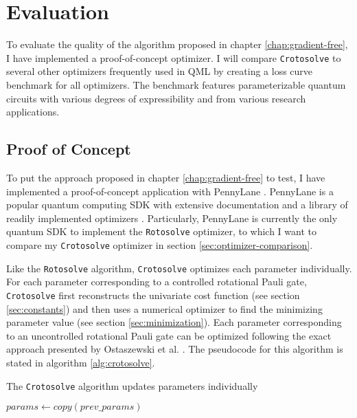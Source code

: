 \chapter{Evaluation}
\label{chap:evaluation}

To evaluate the quality of the algorithm proposed in chapter
\ref{chap:gradient-free}, I have implemented a proof-of-concept optimizer.
I will compare \texttt{Crotosolve} to several other optimizers frequently used
in QML by creating a loss curve benchmark for all optimizers.
The benchmark features parameterizable quantum circuits with various degrees of
expressibility and from various research applications.

\section{Proof of Concept}
\label{sec:proof-of-concept}
To put the approach proposed in chapter \ref{chap:gradient-free} to test,
I have implemented a proof-of-concept application with PennyLane
\cite{bergholm_pennylane_2018}.
PennyLane is a popular quantum computing SDK with extensive documentation and a
library of readily implemented optimizers \cite{unitary_fund_team_results_2022}.
Particularly, PennyLane is currently the only quantum SDK to implement the
\texttt{Rotosolve} optimizer, to which I want to compare my \texttt{Crotosolve}
optimizer in section \ref{sec:optimizer-comparison}.

Like the \texttt{Rotosolve} algorithm, \texttt{Crotosolve} optimizes each
parameter individually.
For each parameter corresponding to a controlled rotational Pauli gate,
\texttt{Crotosolve} first reconstructs the univariate cost function (see section
\ref{sec:constants}) and then uses a numerical optimizer to find the minimizing
parameter value (see section \ref{sec:minimization}).
Each parameter corresponding to an uncontrolled rotational Pauli gate can be
optimized following the exact approach presented by Ostaszewski et al.
\cite{ostaszewski_structure_2021}.
The pseudocode for this algorithm is stated in algorithm \ref{alg:crotosolve}.

\begin{algorithm}
    \caption{The \texttt{Crotosolve} algorithm updates parameters individually}
    \label{alg:crotosolve}
    \BlankLine
    $params \gets copy(prev\_params)$\;
\end{algorithm}

